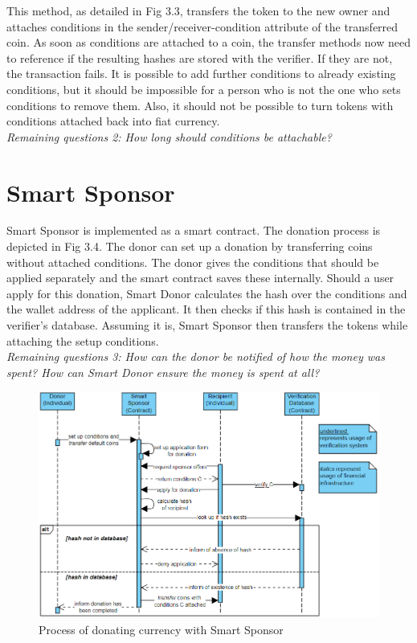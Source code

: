 This method, as detailed in Fig 3.3, transfers the token to the new owner and attaches conditions in the sender/receiver-condition attribute of the transferred coin.
As soon as conditions are attached to a coin, the transfer methods now need to reference if the resulting hashes are stored with the verifier.
If they are not, the transaction fails. It is possible to add further conditions to already existing conditions, but it should be impossible for a person who is not the one who sets conditions to remove them. Also, it should not be possible to turn tokens with conditions attached back into fiat currency.\\
\emph{Remaining questions 2: How long should conditions be attachable?}
\section*{Smart Sponsor}
Smart Sponsor is implemented as a smart contract. The donation process is depicted in Fig 3.4. The donor can set up a donation by transferring coins without attached conditions. The donor gives the conditions that should be applied separately and the smart contract saves these internally. Should a user apply for this donation, Smart Donor calculates the hash over the conditions and the wallet address of the applicant. It then checks if this hash is contained in the verifier's database. Assuming it is, Smart Sponsor then transfers the tokens while attaching the setup conditions.\\
\emph{Remaining questions 3: How can the donor be notified of how the money was spent? How can Smart Donor ensure the money is spent at all?}
\begin{figure}[H]
    \centering
    \includegraphics[scale=0.45]{figures/Smart Sponsor.png}  
    \caption{Process of donating currency with Smart Sponsor}
    \label{fig:my_label}
\end{figure}
